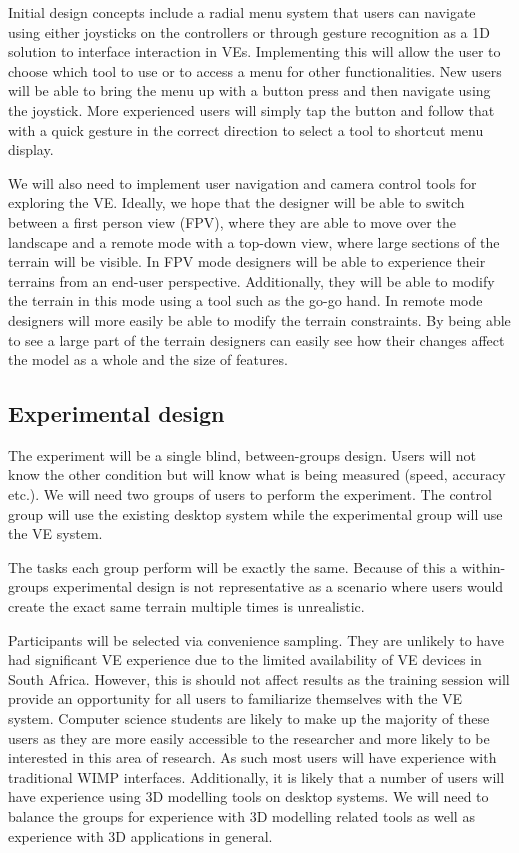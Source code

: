 \documentclass{sig-alternate-05-2015}
\begin{document}
Initial design concepts include a radial menu system that users can navigate using either joysticks on the controllers or through gesture recognition as a 1D solution to interface interaction in VEs\cite{Hand1997}. Implementing this will allow the user to choose which tool to use or to access a menu for other functionalities. New users will be able to bring the menu up with a button press and then navigate using the joystick. More experienced users will simply tap the button and follow that with a quick gesture in the correct direction to select a tool to shortcut menu display.

We will also need to implement user navigation and camera control tools for exploring the VE. Ideally, we hope that the designer will be able to switch between a first person view (FPV), where they are able to move over the landscape and a remote mode with a top-down view, where large sections of the terrain will be visible. In FPV mode designers will be able to experience their terrains from an end-user perspective. Additionally, they will be able to modify the terrain in this mode using a tool such as the go-go hand\cite{Poupyrev1996}. In remote mode designers will more easily be able to modify the terrain constraints. By being able to see a large part of the terrain designers can easily see how their changes affect the model as a whole and the size of features.


\subsection{Experimental design}
The experiment will be a single blind, between-groups design. Users will not know the other condition but will know what is being measured (speed, accuracy etc.). We will need two groups of users to perform the experiment. The control group will use the existing desktop system while the experimental group will use the VE system.

The tasks each group perform will be exactly the same. Because of this a within-groups experimental design is not representative as a scenario where users would create the exact same terrain multiple times is unrealistic.

Participants will be selected via convenience sampling. They are unlikely to have had significant VE experience due to the limited availability of VE devices in South Africa. However, this is should not affect results as the training session will provide an opportunity for all users to familiarize themselves with the VE system. Computer science students are likely to make up the majority of these users as they are more easily accessible to the researcher and more likely to be interested in this area of research. As such most users will have experience with traditional WIMP interfaces. Additionally, it is likely that a number of users will have experience using 3D modelling tools on desktop systems. We will need to balance the groups for experience with 3D modelling related tools as well as experience with 3D applications in general. 
\end{document}

